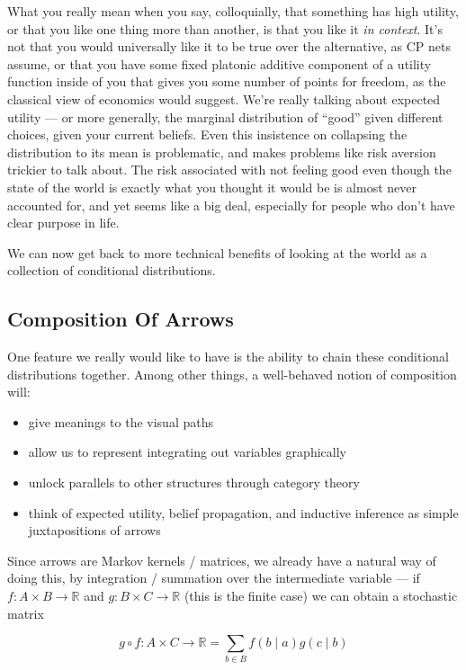 \documentclass{article}
\begin{document}
	What you really mean when you say, colloquially, that something has high utility, or that you like one thing more than another, is that you like it \emph{in context}. It's not that you would universally like it to be true over the alternative, as CP nets assume, or that you have some fixed platonic additive component of a utility function inside of you that gives you some number of points for freedom, as the classical view of economics would suggest. We're really talking about expected utility --- or more generally, the marginal distribution of ``good'' given different choices, given your current beliefs. Even this insistence on collapsing the distribution to its mean is problematic, and makes problems like risk aversion trickier to talk about. The risk associated with not feeling good even though the state of the world is exactly what you thought it would be is almost never accounted for, and yet seems like a big deal, especially for people who don't have clear purpose in life.
	
	We can now get back to more technical benefits of looking at the world as a collection of conditional distributions.

	\subsection{Composition Of Arrows} \label{sec:composition}
	One feature we really would like to have is the ability to chain these conditional distributions together. Among other things, a well-behaved notion of composition will:
	\begin{itemize}[nosep]
		\item give meanings to the visual paths
		\item allow us to represent integrating out variables graphically
		\item unlock parallels to other structures through category theory
		\item think of expected utility, belief propagation, and inductive inference as simple juxtapositions of arrows
	\end{itemize} 
	
	Since arrows are Markov kernels / matrices, we already have a natural way of doing this, by integration / summation over the intermediate variable --- if $f : A \times B \to \mathbb R$ and $g : B \times C \to \mathbb R$ (this is the finite case) we can obtain a stochastic matrix
	
	\[ g\circ f : A \times C \to \mathbb R =  \sum_{b \in B} f( b \mid a) g(c \mid b) \]
	
\end{document}
